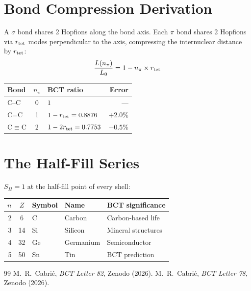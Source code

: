 \documentclass[aps,prl,twocolumn,showpacs,superscriptaddress]{revtex4-2}
\begin{document}
\section{Bond Compression Derivation}

A $\sigma$ bond shares 2 Hopfions along the bond axis. Each 
$\pi$ bond shares 2 Hopfions via $r_{\rm tet}$ modes perpendicular 
to the axis, compressing the internuclear distance by $r_{\rm tet}$:
\begin{equation}
    \frac{L(n_\pi)}{L_0} = 1 - n_\pi \times r_{\rm tet}
\end{equation}

\begin{center}
\begin{tabular}{lclr}
\toprule
Bond & $n_\pi$ & BCT ratio & Error \\
\midrule
C--C & 0 & $1$ & --- \\
C=C  & 1 & $1-r_{\rm tet} = 0.8876$ & $+2.0\%$ \\
C$\equiv$C & 2 & $1-2r_{\rm tet} = 0.7753$ & $-0.5\%$ \\
\bottomrule
\end{tabular}
\end{center}

\section{The Half-Fill Series}

$S_H=1$ at the half-fill point of every shell:

\begin{center}
\begin{tabular}{rclll}
\toprule
$n$ & $Z$ & Symbol & Name & BCT significance \\
\midrule
2 & 6  & C  & Carbon    & Carbon-based life \\
3 & 14 & Si & Silicon   & Mineral structures \\
4 & 32 & Ge & Germanium & Semiconductor \\
5 & 50 & Sn & Tin       & BCT prediction \\
\bottomrule
\end{tabular}
\end{center}

\begin{thebibliography}{99}
 M.~R.~Cabri\'e, \textit{BCT Letter 82}, Zenodo (2026).
 M.~R.~Cabri\'e, \textit{BCT Letter 78}, Zenodo (2026).
\end{thebibliography}
\end{document}
